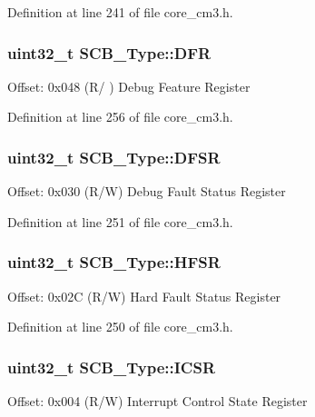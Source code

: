\-Definition at line 241 of file core\-\_\-cm3.\-h.

\hypertarget{struct_s_c_b___type_a586a5225467262b378c0f231ccc77f86}{
\subsubsection[{\-D\-F\-R}]{ uint32\-\_\-t {\bf \-S\-C\-B\-\_\-\-Type\-::\-D\-F\-R}}}\label{struct_s_c_b___type_a586a5225467262b378c0f231ccc77f86}
\-Offset\-: 0x048 (\-R/ ) \-Debug \-Feature \-Register 

\-Definition at line 256 of file core\-\_\-cm3.\-h.

\hypertarget{struct_s_c_b___type_ad7d61d9525fa9162579c3da0b87bff8d}{
\subsubsection[{\-D\-F\-S\-R}]{ uint32\-\_\-t {\bf \-S\-C\-B\-\_\-\-Type\-::\-D\-F\-S\-R}}}\label{struct_s_c_b___type_ad7d61d9525fa9162579c3da0b87bff8d}
\-Offset\-: 0x030 (\-R/\-W) \-Debug \-Fault \-Status \-Register 

\-Definition at line 251 of file core\-\_\-cm3.\-h.

\hypertarget{struct_s_c_b___type_a7bed53391da4f66d8a2a236a839d4c3d}{
\subsubsection[{\-H\-F\-S\-R}]{ uint32\-\_\-t {\bf \-S\-C\-B\-\_\-\-Type\-::\-H\-F\-S\-R}}}\label{struct_s_c_b___type_a7bed53391da4f66d8a2a236a839d4c3d}
\-Offset\-: 0x02\-C (\-R/\-W) \-Hard \-Fault \-Status \-Register 

\-Definition at line 250 of file core\-\_\-cm3.\-h.

\hypertarget{struct_s_c_b___type_a3e66570ab689d28aebefa7e84e85dc4a}{
\subsubsection[{\-I\-C\-S\-R}]{ uint32\-\_\-t {\bf \-S\-C\-B\-\_\-\-Type\-::\-I\-C\-S\-R}}}\label{struct_s_c_b___type_a3e66570ab689d28aebefa7e84e85dc4a}
\-Offset\-: 0x004 (\-R/\-W) \-Interrupt \-Control \-State \-Register 

